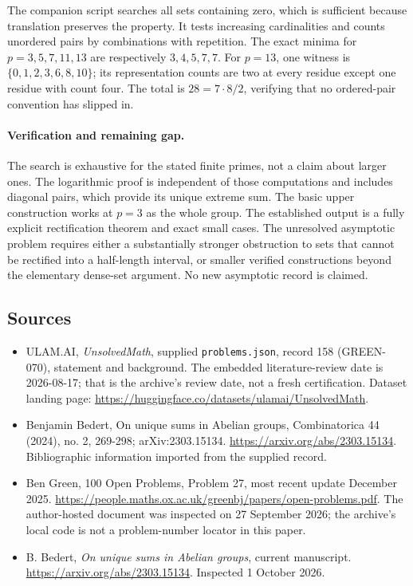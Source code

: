 \documentclass[11pt,a4paper]{article}
\begin{document}
The companion script searches all sets containing zero, which is sufficient because translation preserves the property. It tests increasing cardinalities and counts unordered pairs by combinations with repetition. The exact minima for $p=3,5,7,11,13$ are respectively $3,4,5,7,7$. For $p=13$, one witness is $\{0,1,2,3,6,8,10\}$; its representation counts are two at every residue except one residue with count four. The total is $28=7\cdot8/2$, verifying that no ordered-pair convention has slipped in.

\paragraph{Verification and remaining gap.}
The search is exhaustive for the stated finite primes, not a claim about larger ones. The logarithmic proof is independent of those computations and includes diagonal pairs, which provide its unique extreme sum. The basic upper construction works at $p=3$ as the whole group. The established output is a fully explicit rectification theorem and exact small cases. The unresolved asymptotic problem requires either a substantially stronger obstruction to sets that cannot be rectified into a half-length interval, or smaller verified constructions beyond the elementary dense-set argument. No new asymptotic record is claimed.

\subsection{Sources}

{\small

\begin{itemize}

\item[\hypertarget{source:158:1}{S1}] ULAM.AI, \emph{UnsolvedMath}, supplied \texttt{problems.json}, record 158 (GREEN-070), statement and background. The embedded literature-review date is 2026-08-17; that is the archive’s review date, not a fresh certification. Dataset landing page: \url{https://huggingface.co/datasets/ulamai/UnsolvedMath}.

\item[\hypertarget{source:158:2}{S2}] Benjamin Bedert, On unique sums in Abelian groups, Combinatorica 44 (2024), no. 2, 269-298; arXiv:2303.15134. \url{https://arxiv.org/abs/2303.15134}. Bibliographic information imported from the supplied record.

\item[\hypertarget{source:158:3}{S3}] Ben Green, 100 Open Problems, Problem 27, most recent update December 2025. \url{https://people.maths.ox.ac.uk/greenbj/papers/open-problems.pdf}. The author-hosted document was inspected on 27 September 2026; the archive’s local code is not a problem-number locator in this paper.

\item[E1] B. Bedert, \emph{On unique sums in Abelian groups}, current manuscript. \url{https://arxiv.org/abs/2303.15134}. Inspected 1 October 2026.

\end{itemize}

}

\label{end:158}
\end{document}
